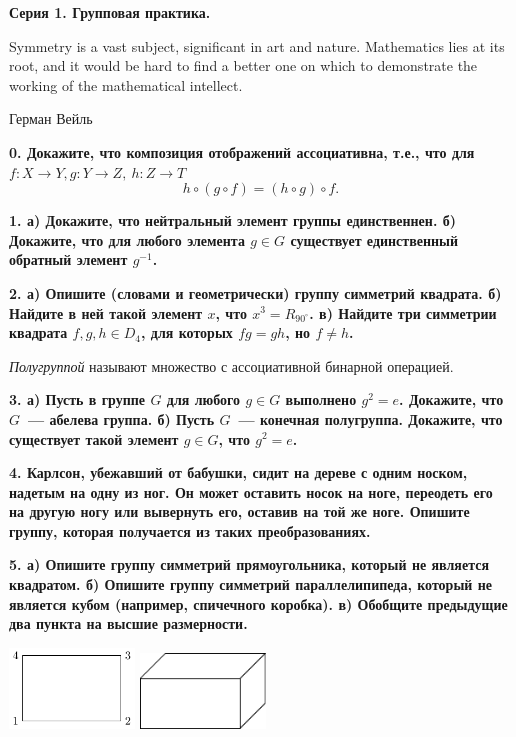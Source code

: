 \documentclass[10pt]{article}
\begin{document}
\begin{landscape}
\begin{multicols}{2}
	\columnbreak

	\centerline{\bf{Серия 1. Групповая практика. }}

	\epigraph{Symmetry is a vast subject, significant in art and nature. Mathematics lies at its root, and it would be hard to find a better one on which to demonstrate the working of the mathematical intellect.}{Герман Вейль}

	\bf{0.} Докажите, что композиция отображений ассоциативна, т.е., что для $f \colon X \to Y, g \colon Y \to Z, \ h \colon Z \to T$
	\[
		h \circ (g \circ f) = (h \circ g) \circ f.
	\]

	\bf{1.} а) Докажите, что нейтральный элемент группы единственнен. б) Докажите, что для любого элемента $g \in G$ существует единственный обратный элемент $g^{-1}$. 

	\bf{2.} а) Опишите (словами и геометрически) группу симметрий квадрата. б) Найдите в ней такой элемент $x$, что $x^3 = R_{90^{\circ}}$. в) Найдите три симметрии квадрата $f, g, h \in D_{4}$, для которых $fg = gh$, но $f \neq h$.

	\begin{definition} 
		\emph{Полугруппой} называют множество с ассоциативной бинарной операцией. 
	\end{definition}

	\bf{3.} а)  Пусть в группе $G$ для любого $g \in G$ выполнено $g^2 = e$. Докажите, что $G$~--- абелева группа.  б) Пусть $G$~--- конечная полугруппа. Докажите, что существует такой элемент $g \in G$, что $g^2 = e$.

	\bf{4.} Карлсон, убежавший от бабушки, сидит на дереве с одним носком, надетым на одну из ног. Он может оставить носок на ноге, переодеть его на другую ногу или вывернуть его, оставив на той же ноге. Опишите группу, которая получается из таких преобразованиях. 

	\bf{5.} а) Опишите группу симметрий прямоугольника, который не является квадратом. б) Опишите группу симметрий параллелипипеда, который не является кубом (например, спичечного коробка). в) Обобщите предыдущие два пункта на высшие размерности. 

	\begin{center}
	\begin{minipage}{6in}
		\includegraphics[width=0.25\textwidth]{pic/pic_1.pdf}
		\hspace{10mm}
		\includegraphics[width=0.25\textwidth]{pic/pic_2.pdf}
	\end{minipage}
	\end{center}


	

	\end{multicols}
	\end{landscape}
\end{document}
